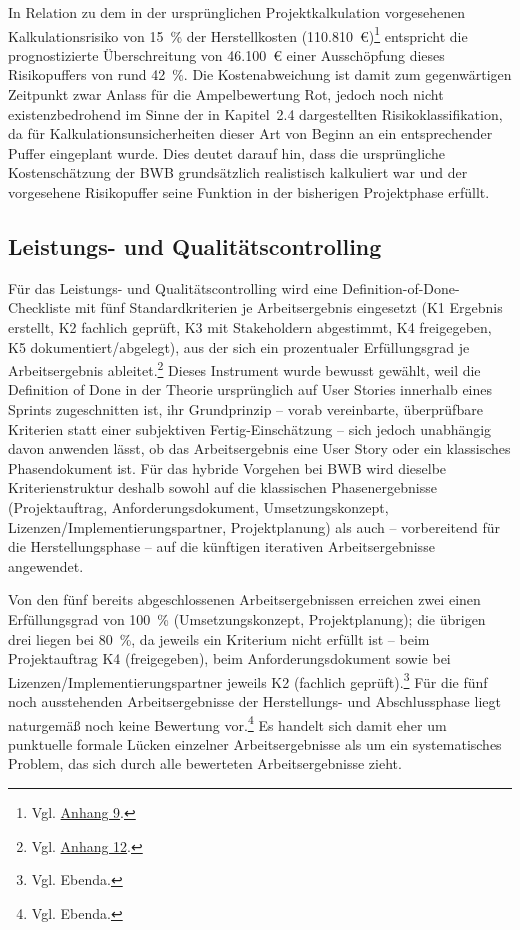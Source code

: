 \documentclass[
    12pt, 
    a4paper,
    ]{scrartcl} %
\begin{document}
In Relation zu dem in der ursprünglichen Projektkalkulation vorgesehenen Kalkulationsrisiko von 15~\% der Herstellkosten (110.810~€)\footnote{Vgl. \hyperref[sec:Anhang9]{Anhang 9}.} entspricht die prognostizierte Überschreitung von 46.100~€ einer Ausschöpfung dieses Risikopuffers von rund 42~\%. Die Kostenabweichung ist damit zum gegenwärtigen Zeitpunkt zwar Anlass für die Ampelbewertung Rot, jedoch noch nicht existenzbedrohend im Sinne der in Kapitel~2.4 dargestellten Risikoklassifikation, da für Kalkulationsunsicherheiten dieser Art von Beginn an ein entsprechender Puffer eingeplant wurde. Dies deutet darauf hin, dass die ursprüngliche Kostenschätzung der BWB grundsätzlich realistisch kalkuliert war und der vorgesehene Risikopuffer seine Funktion in der bisherigen Projektphase erfüllt.

\subsection{Leistungs- und Qualitätscontrolling}

Für das Leistungs- und Qualitätscontrolling wird eine Definition-of-Done-Checkliste mit fünf Standardkriterien je Arbeitsergebnis eingesetzt (K1 Ergebnis erstellt, K2 fachlich geprüft, K3 mit Stakeholdern abgestimmt, K4 freigegeben, K5 dokumentiert/abgelegt), aus der sich ein prozentualer Erfüllungsgrad je Arbeitsergebnis ableitet.\footnote{Vgl. \hyperref[sec:Anhang12]{Anhang 12}.} Dieses Instrument wurde bewusst gewählt, weil die Definition of Done in der Theorie ursprünglich auf User Stories innerhalb eines Sprints zugeschnitten ist, ihr Grundprinzip -- vorab vereinbarte, überprüfbare Kriterien statt einer subjektiven Fertig-Einschätzung -- sich jedoch unabhängig davon anwenden lässt, ob das Arbeitsergebnis eine User Story oder ein klassisches Phasendokument ist. Für das hybride Vorgehen bei BWB wird dieselbe Kriterienstruktur deshalb sowohl auf die klassischen Phasenergebnisse (Projektauftrag, Anforderungsdokument, Umsetzungskonzept, Lizenzen/Implementierungspartner, Projektplanung) als auch -- vorbereitend für die Herstellungsphase -- auf die künftigen iterativen Arbeitsergebnisse angewendet.

Von den fünf bereits abgeschlossenen Arbeitsergebnissen erreichen zwei einen Erfüllungsgrad von 100~\% (Umsetzungskonzept, Projektplanung); die übrigen drei liegen bei 80~\%, da jeweils ein Kriterium nicht erfüllt ist -- beim Projektauftrag K4 (freigegeben), beim Anforderungsdokument sowie bei Lizenzen/Implementierungspartner jeweils K2 (fachlich geprüft).\footnote{Vgl. Ebenda.} Für die fünf noch ausstehenden Arbeitsergebnisse der Herstellungs- und Abschlussphase liegt naturgemäß noch keine Bewertung vor.\footnote{Vgl. Ebenda.} Es handelt sich damit eher um punktuelle formale Lücken einzelner Arbeitsergebnisse als um ein systematisches Problem, das sich durch alle bewerteten Arbeitsergebnisse zieht.
\end{document}

